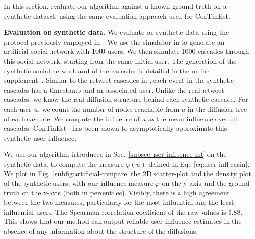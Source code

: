 %
In this section, evaluate our algorithm against a known ground truth on a synthetic dataset, using the same evaluation approach used for ConTinEst.

\textbf{Evaluation on synthetic data.}
We evaluate on synthetic data using the 
protocol previously employed in~\cite{Du2013}.
We use the simulator in \cite{Du2013} to generate an artificial social network with 1000 users.
We then simulate 1000 cascades through this social network, starting from the same initial user.
The generation of the synthetic social network and of the cascades is detailed in the online supplement~\cite[annex~C]{supplemental}.
Similar to the retweet cascades in \debate, each event in the synthetic cascades has a timestamp and an associated user.
Unlike the real retweet cascades, we know the real diffusion structure behind each synthetic cascade.
For each user $u$, we count the number of nodes reachable from $u$ in the diffusion tree of each cascade.
We compute the influence of $u$ as the mean influence over all cascades.
ConTinEst~\cite{Du2013} has been shown to asymptotically approximate this synthetic user influence.

We use our algorithm introduced in Sec.~\ref{subsec:user-influence-mt} on the synthetic data, to compute the measure $\varphi(u)$ defined in Eq.~\ref{eq:user-infl-casin}.
We plot in Fig.~\ref{subfig:artificial-compare} the 2D scatter-plot and the density plot of the synthetic users, with our influence measure $\varphi$ on the y-axis and the ground truth on the x-axis (both in percentiles).
Visibly, there is a high agreement between the two measures, particularly for the most influential and the least influential users.
The Spearman correlation coefficient of the raw values is $0.88$.
This shows that our method can output reliable user influence estimates in the absence of any information about the structure of the diffusions.

